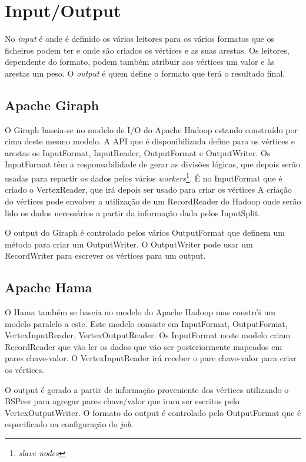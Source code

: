 \newpage
\section{Input/Output}
No \textit{input} é onde é definido os vários leitores para os vários formatos que os ficheiros podem ter e onde são criados os vértices e as suas arestas. Os leitores, dependente do formato, podem também atribuir aos vértices um valor e às arestas um peso.
O \textit{output} é quem define o formato que terá o resultado final.
\subsection*{Apache Giraph}
O Giraph baseia-se no modelo de I/O do Apache Hadoop estando construído por cima deste mesmo modelo.
A API que é disponibilizada define para os vértices e arestas os InputFormat, InputReader, OutputFormat e OutputWriter.
Os InputFormat têm a responsabilidade de gerar as divisões lógicas, que depois serão usadas para repartir os dados pelos vários
\textit{workers}\footnote{\textit{slave nodes}}. É no InputFormat que é criado o VertexReader, que irá depois ser usado para criar os vértices
A criação do vértices pode envolver a utilização de um RecordReader do Hadoop onde serão lido os dados necessários a partir da informação dada pelos
InputSplit.

O output do Giraph é controlado pelos vários OutputFormat que definem um método para criar um OutputWriter. O OutputWriter pode usar um RecordWriter
para escrever os vértices para um output.

\subsection*{Apache Hama}

O Hama também se baseia no modelo do Apache Hadoop mas constrói um modelo paralelo a este.
Este modelo consiste em InputFormat, OutputFormat, VertexInputReader, VertexOutputReader. Os InputFormat neste modelo criam RecordReader 
que vão ler os dados que vão ser posteriormente mapeados em pares chave-valor. O VertexInputReader irá receber o pare chave-valor para criar os
vértices.

O output é gerado a partir de informação proveniente dos vértices utilizando o BSPeer para agregar pares chave/valor que iram
ser escritos pelo VertexOutputWriter. O formato do output é controlado pelo OutputFormat que é especificado na
configuração do \textit{job}.

